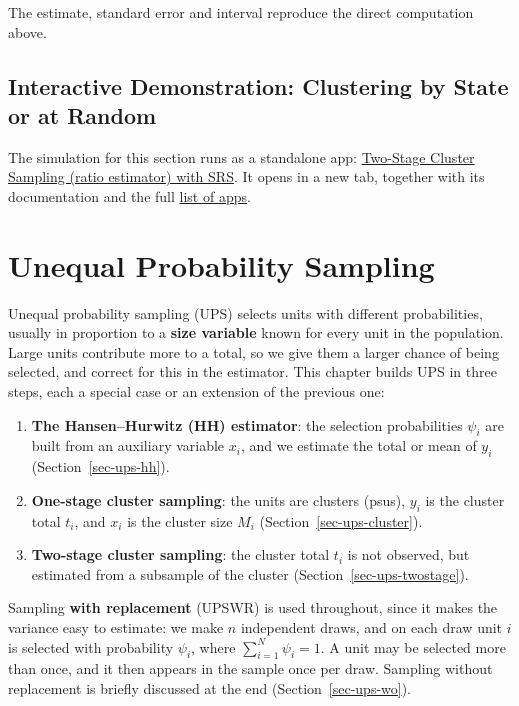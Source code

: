 \documentclass[
  letterpaper,
  DIV=11,
  numbers=noendperiod]{scrreprt}
\providecommand{\tightlist}{%
  \setlength{\itemsep}{0pt}\setlength{\parskip}{0pt}}
\renewcommand{\[}{\begin{equation}}
\renewcommand{\]}{\end{equation}}
\begin{document}
The estimate, standard error and interval reproduce the direct
computation above.

\section{Interactive Demonstration: Clustering by State or at
Random}\label{sec-app-cluster}

The simulation for this section runs as a standalone app:
\href{../shinylives_sampling/app-cluster.html}{Two-Stage Cluster
Sampling (ratio estimator) with SRS}. It opens in a new tab, together
with its documentation and the full
\href{../shinylives_sampling/index.html}{list of apps}.


\chapter{Unequal Probability
Sampling}\label{unequal-probability-sampling}

Unequal probability sampling (UPS) selects units with different
probabilities, usually in proportion to a \textbf{size variable} known
for every unit in the population. Large units contribute more to a
total, so we give them a larger chance of being selected, and correct
for this in the estimator. This chapter builds UPS in three steps, each
a special case or an extension of the previous one:

\begin{enumerate}
\def\labelenumi{\arabic{enumi}.}
\tightlist
\item
  \textbf{The Hansen--Hurwitz (HH) estimator}: the selection
  probabilities \(\psi_i\) are built from an auxiliary variable \(x_i\),
  and we estimate the total or mean of \(y_i\)
  (Section~\ref{sec-ups-hh}).
\item
  \textbf{One-stage cluster sampling}: the units are clusters (psus),
  \(y_i\) is the cluster total \(t_i\), and \(x_i\) is the cluster size
  \(M_i\) (Section~\ref{sec-ups-cluster}).
\item
  \textbf{Two-stage cluster sampling}: the cluster total \(t_i\) is not
  observed, but estimated from a subsample of the cluster
  (Section~\ref{sec-ups-twostage}).
\end{enumerate}

Sampling \textbf{with replacement} (UPSWR) is used throughout, since it
makes the variance easy to estimate: we make \(n\) independent draws,
and on each draw unit \(i\) is selected with probability \(\psi_i\),
where \(\sum_{i=1}^N\psi_i=1\). A unit may be selected more than once,
and it then appears in the sample once per draw. Sampling without
replacement is briefly discussed at the end (Section~\ref{sec-ups-wo}).
\end{document}

